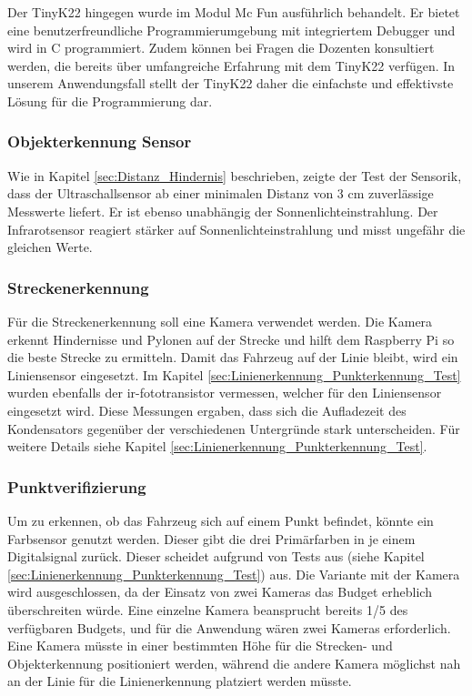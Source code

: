 \documentclass[../main.tex]{subfiles}
\begin{document}
    Der TinyK22 hingegen wurde im Modul Mc Fun ausführlich behandelt. Er bietet eine benutzerfreundliche Programmierumgebung mit integriertem Debugger und wird in C programmiert. Zudem können bei Fragen die Dozenten konsultiert werden, die bereits über umfangreiche Erfahrung mit dem TinyK22 verfügen. In unserem Anwendungsfall stellt der TinyK22 daher die einfachste und effektivste Lösung für die Programmierung dar.


\subsubsection{Objekterkennung Sensor}
\label{a3:Objekterkennung_Sensor}
Wie in Kapitel \ref{sec:Distanz_Hindernis} beschrieben, zeigte der Test der Sensorik, dass der Ultraschallsensor ab einer minimalen Distanz von 3 cm zuverlässige Messwerte liefert. Er ist ebenso unabhängig der Sonnenlichteinstrahlung. Der Infrarotsensor reagiert stärker auf Sonnenlichteinstrahlung und misst ungefähr die gleichen Werte. 



\subsubsection{Streckenerkennung}
Für die Streckenerkennung soll eine Kamera verwendet werden. Die Kamera erkennt Hindernisse und Pylonen auf der Strecke und hilft dem Raspberry Pi so die beste Strecke zu ermitteln. Damit das Fahrzeug auf der Linie bleibt, wird ein Liniensensor eingesetzt.  Im Kapitel \ref{sec:Linienerkennung_Punkterkennung_Test} wurden ebenfalls der \gls{ir-fototransistor} vermessen, welcher für den Liniensensor eingesetzt wird. Diese Messungen ergaben, dass sich die Aufladezeit des Kondensators gegenüber der verschiedenen Untergründe stark unterscheiden. Für weitere Details siehe Kapitel \ref{sec:Linienerkennung_Punkterkennung_Test}. 

\subsubsection{Punktverifizierung}
Um zu erkennen, ob das Fahrzeug sich auf einem Punkt befindet, könnte ein Farbsensor genutzt werden. Dieser gibt die drei Primärfarben in je einem Digitalsignal zurück. Dieser scheidet aufgrund von Tests aus (siehe Kapitel \ref{sec:Linienerkennung_Punkterkennung_Test}) aus. Die Variante mit der Kamera wird ausgeschlossen, da der Einsatz von zwei Kameras das Budget erheblich überschreiten würde. Eine einzelne Kamera beansprucht bereits 1/5 des verfügbaren Budgets, und für die Anwendung wären zwei Kameras erforderlich. Eine Kamera müsste in einer bestimmten Höhe für die Strecken- und Objekterkennung positioniert werden, während die andere Kamera möglichst nah an der Linie für die Linienerkennung platziert werden müsste.
\end{document}

